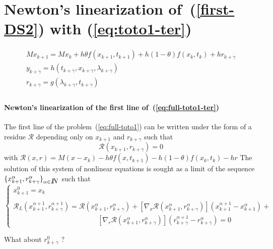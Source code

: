 \section{Newton's linearization of~(\ref{first-DS2}) with  (\ref{eq:toto1-ter}) } 

  \begin{equation}
    \begin{array}{l}
      \label{eq:full-toto1-ter}
      M x_{k+1} = M x_{k} +h \theta f(x_{k+1},t_{k+1}) +h(1-\theta)f(x_{k},t_{k}) + h r_{k+\gamma} \\[2mm]
      y_{k+\gamma} =  h(t_{k+\gamma},x_{k+\gamma},\lambda _{k+\gamma}) \\[2mm]
      r_{k+\gamma} = g(\lambda_{k+\gamma},t_{k+\gamma})\\[2mm]
    \end{array}
\end{equation}

 \paragraph{Newton's linearization of the first line of~(\ref{eq:full-toto1-ter})} The first line of the  problem~(\ref{eq:full-toto1}) can be written under the form of a residue $\mathcal R$ depending only on $x_{k+1}$ and $r_{k+\gamma}$ such that 
\begin{equation}
  \label{eq:full-NL3}
  \mathcal R (x_{k+1},r _{k+\gamma}) =0
\end{equation}
with $\mathcal R(x,r) = M(x - x_{k}) -h\theta f( x , t_{k+1}) - h(1-\theta)f(x_k,t_k) - h r $
The solution of this system of nonlinear equations is sought as a limit of the sequence $\{ x^{\alpha}_{k+1},r^{\alpha}_{k+\gamma} \}_{\alpha \in \mbox{\rm $I\!\!N$}}$ such that
 \begin{equation}
   \label{eq:full-NL7}
   \begin{cases}
     x^{0}_{k+1} = x_k \\ \\
     \mathcal R_L( x^{\alpha+1}_{k+1},r^{\alpha+1}_{k+\gamma}) = \mathcal
     R(x^{\alpha}_{k+1},r^{\alpha}_{k+\gamma})  + \left[ \nabla_{x} \mathcal
     R(x^{\alpha}_{k+1},r^{\alpha}_{k+\gamma})\right] (x^{\alpha+1}_{k+1}-x^{\alpha}_{k+1} ) + \\[2mm]
     \qquad\qquad\qquad\qquad\qquad\qquad\left[ \nabla_{r} \mathcal R(x^{\alpha}_{k+1},r^{\alpha}_{k+\gamma})\right] (r^{\alpha+1}_{k+\gamma} - r^{\alpha}_{k+\gamma} ) =0
 \end{cases}
\end{equation}
\begin{ndrva}
  What about $r^0_{k+\gamma}$ ?
\end{ndrva}

